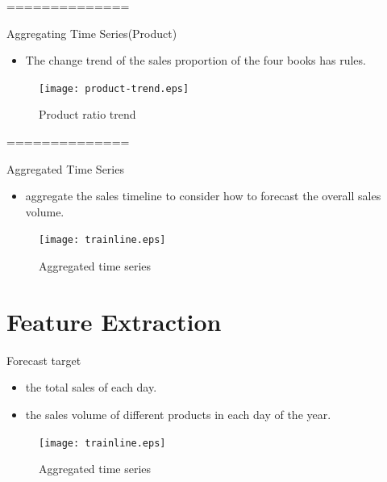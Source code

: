 \documentclass[
 size=14pt,
 paper=smartboard,  %
 mode=present, 		%
 display=slides, 	%
 style=tuliplab,  	%
 pauseslide,
 fleqn,leqno]{powerdot}
\begin{document}
==============
\begin{slide}[toc=,bm=]{Aggregating Time Series(Product)}
	\begin{itemize}
		\item
		The change trend of the sales proportion of the four books has rules.
	\end{itemize}
		\begin{figure}
			\centering
			\texttt{[image: product-trend.eps]}
			\caption{Product ratio trend}\label{fig:OutAspect-target}
		\end{figure}
\end{slide}

==============
\begin{slide}[toc=,bm=]{Aggregated Time Series}
	\begin{itemize}
		\item
		aggregate the sales timeline to consider how to forecast the overall sales volume.
	\end{itemize}
	\begin{figure}
		\centering
		\texttt{[image: trainline.eps]}
		\caption{Aggregated time series}\label{fig:OutAspect-target}
	\end{figure}
\end{slide}
\section{Feature Extraction}


\begin{slide}[toc=,bm=]{Forecast target}
	\begin{itemize}
		\item
		the total sales of each day.
		\item
		the sales volume of different products in each day of the year.
	\end{itemize}
	\begin{figure}
		\centering
		\texttt{[image: trainline.eps]}
		\caption{Aggregated time series}\label{fig:OutAspect-target}
	\end{figure}
\end{slide}
\end{document}
